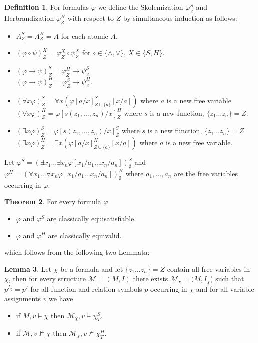 \documentclass[a4paper,12pt]{report}
\theoremstyle{definition}
\newtheorem{theorem}{Theorem}[section]
\theoremstyle{definition}
\theoremstyle{definition}
\newtheorem{lemma}[theorem]{Lemma}
\theoremstyle{definition}
\theoremstyle{definition}
\newtheorem{definition}[theorem]{Definition}
\theoremstyle{definition}
\theoremstyle{definition}
\begin{document}
	\begin{definition}
		For formulas $\varphi$ we define the Skolemization $\varphi^S_Z$ and Herbrandization $\varphi^H_Z$ with respect to $Z$ by simultaneous induction as follows:
		\begin{itemize}
			\item $A^S_Z = A^H_Z = A$ for each atomic $A$.
			\item $(\varphi\circ\psi)^X_Z = \varphi^X_Z\circ\psi^X_Z$ for $\circ\in\{\wedge, \vee\}$, $X\in\{S, H\}$.
			\item $(\varphi\to\psi)^S_Z = \varphi^H_Z\to \psi^S_Z$\\$(\varphi\to\psi)^H_Z = \varphi^S_Z\to\psi^H_Z$.
			\item $(\forall x\varphi)^S_Z = \forall x(\varphi[a/x]^S_{Z\cup\{a\}}[x/a])$ where $a$ is a new free variable\\$(\forall x\varphi)^H_Z = \varphi[s(z_1,\dots,z_n)/x]^H_Z$ where $s$ is a new function, $\{z_1\dots z_n\} = Z$.
			\item $(\exists x\varphi)^S_Z = \varphi[s(z_1,\dots,z_n)/x]^S_Z$ where $s$ is a new function, $\{z_1\dots z_n\} = Z$\\$(\exists x\varphi)^H_Z = \exists x(\varphi[a/x]^H_{Z\cup\{a\}}[x/a])$ where $a$ is a new free variable.
		\end{itemize}
		Let $\varphi^S = (\exists x_1\dots\exists x_n \varphi[x_1/a_1\dots x_n/a_n])^S_\emptyset$ and $\varphi^H = (\forall x_1\dots\forall x_n \varphi[x_1/a_1\dots x_n/a_n])^H_\emptyset$ where $a_1,\dots,a_n$ are the free variables occurring in $\varphi$.
	\end{definition}
	
	\begin{theorem}
		\label{thm:herbrand-skolem}
		For every formula $\varphi$
		\begin{itemize}
			\item $\varphi$ and $\varphi^S$ are classically equisatisfiable.
			\item $\varphi$ and $\varphi^H$ are classically equivalid.
		\end{itemize}
	\end{theorem}
	which follows from the following two Lemmata:
	\begin{lemma}
		Let $\chi$ be a formula and let $\{z_1\dots z_n\} = Z$ contain all free variables in $\chi$, then for every structure $\mathcal M = (M, I)$ there exists $\mathcal M_\chi = (M, I_\chi$) such that $p^{I_{\chi}} = p^I$ for all function and relation symbols $p$ occurring in $\chi$ and for all variable assignments $v$ we have
		\begin{itemize}
			\item if $M, v \models\chi$ then $\mathcal M_\chi, v\models\chi^S_T$.
			\item if $\mathcal M, v\not\models\chi$ then $\mathcal M_\chi, v\not\models\chi^H_T$.
		\end{itemize}
	\end{lemma}
	
\end{document}
